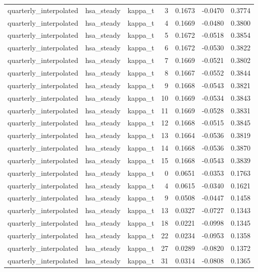 \begin{tabular}{lllrrrr}
quarterly\_interpolated & hsa\_steady & kappa\_t & 3 & 0.1673 & -0.0470 & 0.3774 \\
quarterly\_interpolated & hsa\_steady & kappa\_t & 4 & 0.1669 & -0.0480 & 0.3800 \\
quarterly\_interpolated & hsa\_steady & kappa\_t & 5 & 0.1672 & -0.0518 & 0.3854 \\
quarterly\_interpolated & hsa\_steady & kappa\_t & 6 & 0.1672 & -0.0530 & 0.3822 \\
quarterly\_interpolated & hsa\_steady & kappa\_t & 7 & 0.1669 & -0.0521 & 0.3802 \\
quarterly\_interpolated & hsa\_steady & kappa\_t & 8 & 0.1667 & -0.0552 & 0.3844 \\
quarterly\_interpolated & hsa\_steady & kappa\_t & 9 & 0.1668 & -0.0543 & 0.3821 \\
quarterly\_interpolated & hsa\_steady & kappa\_t & 10 & 0.1669 & -0.0534 & 0.3843 \\
quarterly\_interpolated & hsa\_steady & kappa\_t & 11 & 0.1669 & -0.0528 & 0.3831 \\
quarterly\_interpolated & hsa\_steady & kappa\_t & 12 & 0.1668 & -0.0515 & 0.3845 \\
quarterly\_interpolated & hsa\_steady & kappa\_t & 13 & 0.1664 & -0.0536 & 0.3819 \\
quarterly\_interpolated & hsa\_steady & kappa\_t & 14 & 0.1668 & -0.0536 & 0.3870 \\
quarterly\_interpolated & hsa\_steady & kappa\_t & 15 & 0.1668 & -0.0543 & 0.3839 \\
quarterly\_interpolated & hsa\_steady & kappa\_t & 0 & 0.0651 & -0.0353 & 0.1763 \\
quarterly\_interpolated & hsa\_steady & kappa\_t & 4 & 0.0615 & -0.0340 & 0.1621 \\
quarterly\_interpolated & hsa\_steady & kappa\_t & 9 & 0.0508 & -0.0447 & 0.1458 \\
quarterly\_interpolated & hsa\_steady & kappa\_t & 13 & 0.0327 & -0.0727 & 0.1343 \\
quarterly\_interpolated & hsa\_steady & kappa\_t & 18 & 0.0221 & -0.0998 & 0.1345 \\
quarterly\_interpolated & hsa\_steady & kappa\_t & 22 & 0.0234 & -0.0953 & 0.1358 \\
quarterly\_interpolated & hsa\_steady & kappa\_t & 27 & 0.0289 & -0.0820 & 0.1372 \\
quarterly\_interpolated & hsa\_steady & kappa\_t & 31 & 0.0314 & -0.0808 & 0.1365 \\

\end{tabular}
